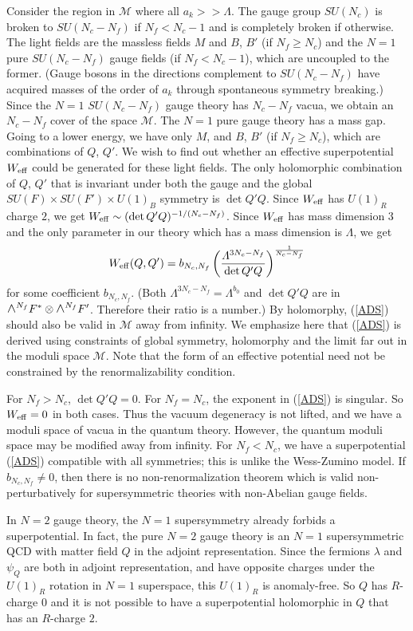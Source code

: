 \documentclass[lecture]{qft-l}
\newcommand{\lam}{\lambda}
\newcommand{\Lam}{\varLambda}
\newcommand{\medwedge}{\mbox{\fontsize{12pt}{0pt}\selectfont $\wedge$}}
\newcommand{\inv}[1]{\frac{1}{#1}}
\newcommand{\MM}{{\mathcal M}}
\newcommand{\eff}{_{{\rm eff}}}
\newcommand{\FT}{F'}%
\newcommand{\QT}{Q'}%
\newcommand{\BT}{B'}%
\newcommand{\LINE}{\medwedge^{N_f}F^*\otimes\medwedge^{N_f}\FT}
\numberwithin{figure}{chapter}
\begin{document}
Consider the region in $\MM$ where all $a_k>\!>\Lam$.
The gauge group $SU(N_c)$ is broken to $SU(N_c-N_f)$ if $N_f<N_c-1$
and is completely broken if otherwise.
The light fields are the massless fields $M$ and $B$, $\BT$ (if $N_f\ge N_c$) 
and the $N=1$ pure $SU(N_c-N_f)$ gauge fields (if $N_f<N_c-1$), which are 
uncoupled to the former.
(Gauge bosons in the directions complement to $SU(N_c-N_f)$ have acquired
masses of the order of $a_k$ through spontaneous symmetry breaking.)
Since the $N=1$ $SU(N_c-N_f)$ gauge theory has $N_c-N_f$ vacua,
we obtain an $N_c-N_f$ cover of the space $\MM$.
The $N=1$ pure gauge theory has a mass gap.
Going to a lower energy, we have only $M$, and $B$, $\BT$ (if $N_f\ge N_c$),
which are combinations of $Q$, $\QT$.
We wish to find out whether an effective superpotential $W\eff$ could be 
generated for these light fields.
The only holomorphic combination of $Q$, $\QT$ that is invariant under 
both the gauge and the global $SU(F)\times SU(\FT)\times U(1)_B$ symmetry
is $\det\QT Q$.
Since $W\eff$ has $U(1)_R$ charge $2$, we get 
$W\eff\sim(\det\QT Q)^{-1/(N_c-N_f)}$.
Since $W\eff$ has mass dimension $3$ and the only parameter in our theory 
which has a mass dimension is $\Lam$, we get
	\begin{equation}\label{ADS}
W\eff(Q,\QT)=
b_{N_c,N_f}\left(\frac{\Lam^{3N_c-N_f}}{\det\QT Q}\right)^{\inv{N_c-N_f}}
	\end{equation}
for some coefficient $b_{N_c,N_f}$.
(Both $\Lam^{3N_c-N_f}=\Lam^{b_0}$ and $\det\QT Q$ are in $\LINE$.
Therefore their ratio is a number.)
By holomorphy, (\ref{ADS}) should also be valid in $\MM$ away from infinity.
We emphasize here that (\ref{ADS}) is derived using constraints of global
symmetry, holomorphy and the limit far out in the moduli space $\MM$.
Note that the form of an effective potential need not be constrained by
the renormalizability condition.

For $N_f>N_c$, $\det\QT Q=0$.
For $N_f=N_c$, the exponent in (\ref{ADS}) is singular.
So $W\eff=0$ in both cases.
Thus the vacuum degeneracy is not lifted,
and we have a moduli space of vacua in the quantum theory.
However, the quantum moduli space may be modified away from infinity.
For $N_f<N_c$, we have a superpotential (\ref{ADS}) compatible with all
symmetries; this is unlike the Wess-Zumino model.
If $b_{N_c,N_f}\ne0$, then there is no non-renormalization theorem which is
valid non-perturbatively for supersymmetric theories with non-Abelian gauge
fields.

In $N=2$ gauge theory, the $N=1$ supersymmetry already forbids 
a superpotential.
In fact, the pure $N=2$ gauge theory is an $N=1$ supersymmetric QCD with matter
field $Q$ in the adjoint representation.
Since the fermions $\lam$ and $\psi_Q$ are both in adjoint representation,
and have opposite charges under the $U(1)_R$ rotation in $N=1$ superspace,
this $U(1)_R$ is anomaly-free.
So $Q$ has $R$-charge $0$ and it is not possible to have a superpotential
holomorphic in $Q$ that has an $R$-charge $2$.
\end{document}
